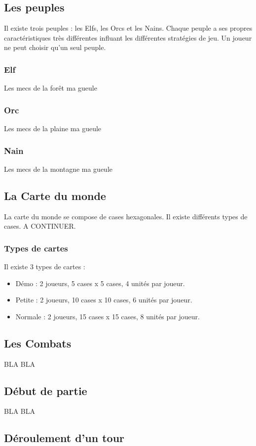 \documentclass[12pt]{article}
\begin{document}
\subsection{Les peuples}
Il existe trois peuples : les Elfs, les Orcs et les Nains. Chaque peuple a ses propres caractéristiques très différentes influant les différentes stratégies de jeu. Un joueur ne peut choisir qu'un seul peuple.
\subsubsection{Elf}
Les mecs de la forêt ma gueule
\subsubsection{Orc}
Les mecs de la plaine ma gueule
\subsubsection{Nain}
Les mecs de la montagne ma gueule

\subsection{La Carte du monde}
La carte du monde se compose de cases hexagonales. Il existe différents types de cases. A CONTINUER.

\subsubsection{Types de cartes}
Il existe 3 types de cartes :
\begin{itemize}
  \item Démo : 2 joueurs, 5 cases x 5 cases, 4 unités par joueur.
  \item Petite : 2 joueurs, 10 cases x 10 cases, 6 unités par joueur.
  \item Normale :  2 joueurs, 15 cases x 15 cases, 8 unités par joueur.
\end{itemize}

\subsection{Les Combats}
BLA BLA

\subsection{Début de partie}
BLA BLA

\subsection{Déroulement d'un tour}
\newpage
\end{document}
